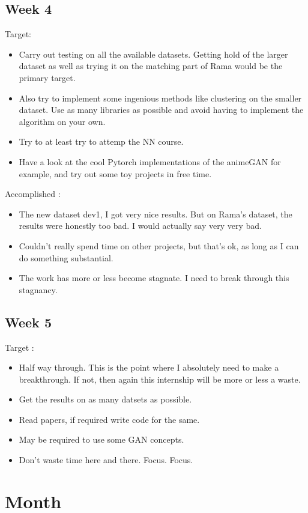 \documentclass{article}
\begin{document}
\subsection{Week 4}
Target:
\begin{itemize}
\item Carry out testing on all the available datasets. Getting hold of the larger dataset as well as trying it on the matching part of Rama would be the primary target.
\item Also try to implement some ingenious methods like clustering on the smaller dataset. Use as many libraries as possible and avoid having to implement the algorithm on your own.
\item Try to at least try to attemp the NN course.
\item Have a look at the cool Pytorch implementations of the animeGAN for example, and try out some toy projects in free time.
\end{itemize}

Accomplished :
\begin{itemize}
\item The new dataset dev1, I got very nice results. But on Rama's dataset, the results were honestly too bad. I would actually say very very bad.
\item Couldn't really spend time on other projects, but that's ok, as long as I can do something substantial.
\item The work has more or less become stagnate. I need to break through this stagnancy.
\end{itemize}

\subsection{Week 5}
Target :
\begin{itemize}
\item Half way through. This is the point where I absolutely need to make a breakthrough. If not, then again this internship will be more or less a waste.
\item Get the results on as many datsets as possible.
\item Read papers, if required write code for the same.
\item May be required to use some GAN concepts.
\item Don't waste time here and there. Focus. Focus.
\end{itemize}
\section{Month}
\end{document}
